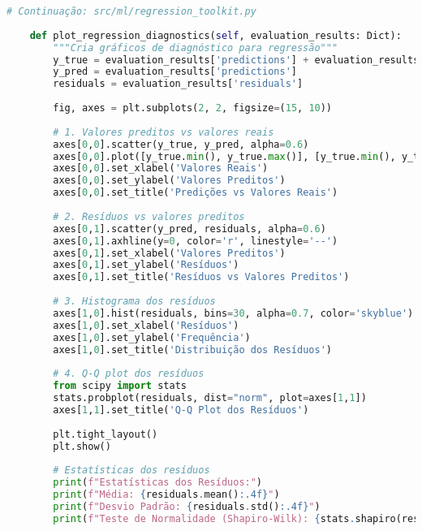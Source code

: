 \begin{pythonbox}
\begin{lstlisting}[language=Python]
# Continuação: src/ml/regression_toolkit.py
    
    def plot_regression_diagnostics(self, evaluation_results: Dict):
        """Cria gráficos de diagnóstico para regressão"""
        y_true = evaluation_results['predictions'] + evaluation_results['residuals']
        y_pred = evaluation_results['predictions']
        residuals = evaluation_results['residuals']
        
        fig, axes = plt.subplots(2, 2, figsize=(15, 10))
        
        # 1. Valores preditos vs valores reais
        axes[0,0].scatter(y_true, y_pred, alpha=0.6)
        axes[0,0].plot([y_true.min(), y_true.max()], [y_true.min(), y_true.max()], 'r--', lw=2)
        axes[0,0].set_xlabel('Valores Reais')
        axes[0,0].set_ylabel('Valores Preditos')
        axes[0,0].set_title('Predições vs Valores Reais')
        
        # 2. Resíduos vs valores preditos
        axes[0,1].scatter(y_pred, residuals, alpha=0.6)
        axes[0,1].axhline(y=0, color='r', linestyle='--')
        axes[0,1].set_xlabel('Valores Preditos')
        axes[0,1].set_ylabel('Resíduos')
        axes[0,1].set_title('Resíduos vs Valores Preditos')
        
        # 3. Histograma dos resíduos
        axes[1,0].hist(residuals, bins=30, alpha=0.7, color='skyblue')
        axes[1,0].set_xlabel('Resíduos')
        axes[1,0].set_ylabel('Frequência')
        axes[1,0].set_title('Distribuição dos Resíduos')
        
        # 4. Q-Q plot dos resíduos
        from scipy import stats
        stats.probplot(residuals, dist="norm", plot=axes[1,1])
        axes[1,1].set_title('Q-Q Plot dos Resíduos')
        
        plt.tight_layout()
        plt.show()
        
        # Estatísticas dos resíduos
        print(f"Estatísticas dos Resíduos:")
        print(f"Média: {residuals.mean():.4f}")
        print(f"Desvio Padrão: {residuals.std():.4f}")
        print(f"Teste de Normalidade (Shapiro-Wilk): {stats.shapiro(residuals)[1]:.4f}")
    \end{lstlisting}
\end{pythonbox}
